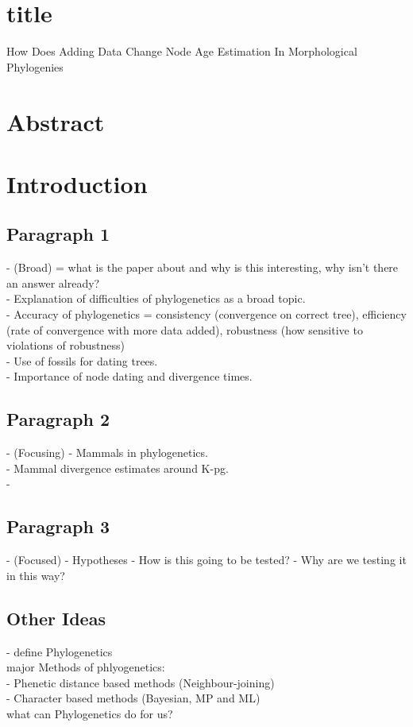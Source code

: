 \documentclass[a4paper,11pt]{article}
\begin{document}
\section{title}

How Does Adding Data Change Node Age Estimation In Morphological Phylogenies

\section{Abstract}

\section{Introduction}

\subsection{Paragraph 1}
- (Broad) = what is the paper about and why is this interesting, why isn't there an answer already?\\
- Explanation of difficulties of phylogenetics as a broad topic.\\
- Accuracy of phylogenetics = consistency (convergence on correct tree), efficiency (rate of convergence with more data added), robustness (how sensitive to violations of robustness)\\
- Use of fossils for dating trees.\\
- Importance of node dating and divergence times.\\

\subsection{Paragraph 2}
- (Focusing)
- Mammals in phylogenetics.\\
- Mammal divergence estimates around K-pg.\\
- 

\subsection{Paragraph 3}
- (Focused)
- Hypotheses
- How is this going to be tested? 
- Why are we testing it in this way?

\subsection{Other Ideas}
- define Phylogenetics\\
major Methods of phlyogenetics:\\ 
- Phenetic distance based methods (Neighbour-joining)\\
- Character based methods (Bayesian, MP and ML)\\
what can Phylogenetics do for us?\\
\end{document}
